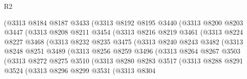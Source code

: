 \begin{lexlean}{R2}
\begin{coremodule}
                    (@3313
                      @8184
                      @8187
                      @3433
                      (@3313
                        @8192
                        @8195
                        @3440
                        (@3313
                          @8200
                          @8203
                          @3447
                          (@3313
                            @8208
                            @8211
                            @3454
                            (@3313
                              @8216
                              @8219
                              @3461
                              (@3313
                                @8224
                                @8227
                                @3468
                                (@3313
                                  @8232
                                  @8235
                                  @3475
                                  (@3313
                                    @8240
                                    @8243
                                    @3482
                                    (@3313
                                      @8248
                                      @8251
                                      @3489
                                      (@3313
                                        @8256
                                        @8259
                                        @3496
                                        (@3313
                                          @8264
                                          @8267
                                          @3503
                                          (@3313
                                            @8272
                                            @8275
                                            @3510
                                            (@3313
                                              @8280
                                              @8283
                                              @3517
                                              (@3313
                                                @8288
                                                @8291
                                                @3524
                                                (@3313
                                                  @8296
                                                  @8299
                                                  @3531
                                                  (@3313
                                                    @8304

\end{coremodule}
\end{lexlean}
